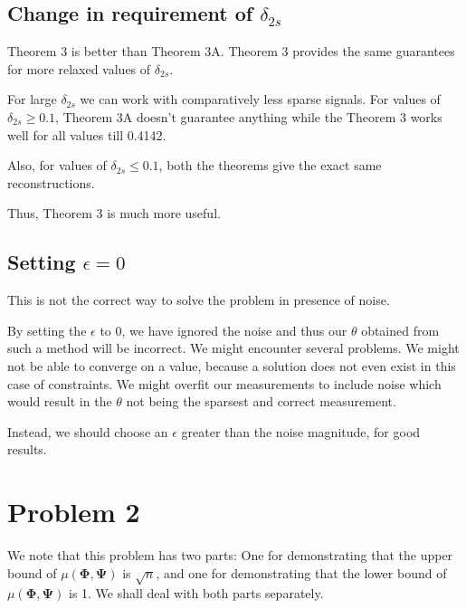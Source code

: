 \documentclass[a4paper,11pt]{article}
\numberwithin{definition}{section}
\numberwithin{mytheorem}{subsection}
\begin{document}
\subsection{Change in requirement of $\delta_{2s}$}

Theorem 3 is better than Theorem 3A. Theorem 3 provides the same guarantees for more relaxed values of $\delta_{2s}$.

For large $\delta_{2s}$ we can work with comparatively less sparse signals. For values of $\delta_{2s} \geq 0.1$, Theorem 3A doesn't guarantee anything while the Theorem 3 works well for all values till 0.4142.

Also, for values of $\delta_{2s} \leq 0.1$, both the theorems give the exact same reconstructions.

Thus, Theorem 3 is much more useful.


\subsection{Setting $\epsilon = 0$}

This is not the correct way to solve the problem in presence of noise.

By setting the $\epsilon$ to 0, we have ignored the noise and thus our $\theta$ obtained from such a method will be incorrect. We might encounter several problems. We might not be able to converge on a value, because a solution does not even exist in this case of constraints. We might overfit our measurements to include noise which would result in the $\theta$ not being the sparsest and correct measurement.

Instead, we should choose an $\epsilon$ greater than the noise magnitude, for good results.



\newpage


\section{Problem 2}
We note that this problem has two parts: One for demonstrating that the upper bound of $\mu(\boldsymbol{\Phi, \Psi})$ is $\sqrt{n}$, and one for demonstrating that the lower bound of $\mu(\boldsymbol{\Phi, \Psi})$ is 1. We shall deal with both parts separately.\\
\end{document}
